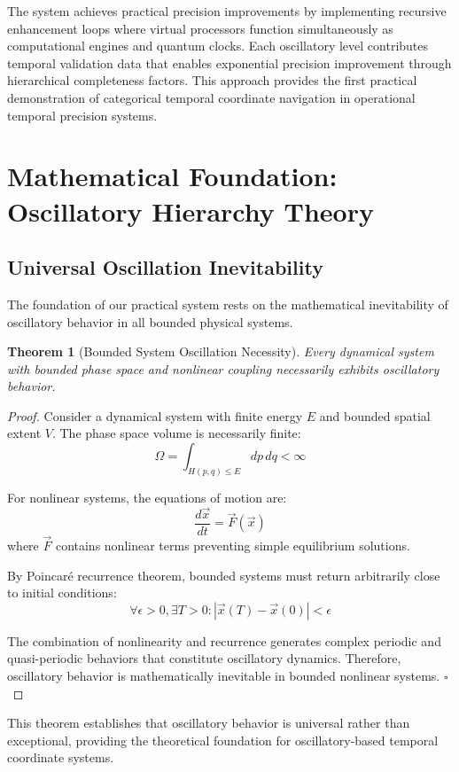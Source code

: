 \documentclass[12pt,a4paper]{article}
\newtheorem{theorem}{Theorem}
\begin{document}
The system achieves practical precision improvements by implementing recursive enhancement loops where virtual processors function simultaneously as computational engines and quantum clocks. Each oscillatory level contributes temporal validation data that enables exponential precision improvement through hierarchical completeness factors. This approach provides the first practical demonstration of categorical temporal coordinate navigation in operational temporal precision systems.

\section{Mathematical Foundation: Oscillatory Hierarchy Theory}

\subsection{Universal Oscillation Inevitability}

The foundation of our practical system rests on the mathematical inevitability of oscillatory behavior in all bounded physical systems.

\begin{theorem}[Bounded System Oscillation Necessity]
Every dynamical system with bounded phase space and nonlinear coupling necessarily exhibits oscillatory behavior.
\end{theorem}

\begin{proof}
Consider a dynamical system with finite energy $E$ and bounded spatial extent $V$. The phase space volume is necessarily finite:
$$\Omega = \int_{H(p,q) \leq E} dp \, dq < \infty$$

For nonlinear systems, the equations of motion are:
$$\frac{d\vec{x}}{dt} = \vec{F}(\vec{x})$$
where $\vec{F}$ contains nonlinear terms preventing simple equilibrium solutions.

By Poincaré recurrence theorem, bounded systems must return arbitrarily close to initial conditions:
$$\forall \epsilon > 0, \exists T > 0: |\vec{x}(T) - \vec{x}(0)| < \epsilon$$

The combination of nonlinearity and recurrence generates complex periodic and quasi-periodic behaviors that constitute oscillatory dynamics. Therefore, oscillatory behavior is mathematically inevitable in bounded nonlinear systems. $\square$
\end{proof}

This theorem establishes that oscillatory behavior is universal rather than exceptional, providing the theoretical foundation for oscillatory-based temporal coordinate systems.
\end{document}
